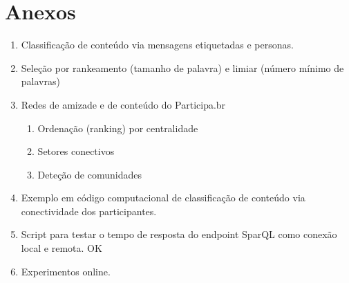 \section*{Anexos}
\begin{enumerate}
\item Classificação de conteúdo via mensagens etiquetadas e personas.
\item Seleção por rankeamento (tamanho de palavra) e limiar (número mínimo de palavras)
\item Redes de amizade e de conteúdo do Participa.br
\begin{enumerate}
    \item Ordenação (ranking) por centralidade
    \item Setores conectivos
    \item Deteção de comunidades
\end{enumerate}
\item Exemplo em código computacional de classificação de conteúdo via conectividade dos participantes.
\item Script para testar o tempo de resposta do endpoint SparQL como conexão local e remota. OK
\item Experimentos online.
\end{enumerate}
